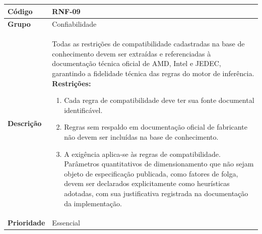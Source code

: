 \FloatBarrier
\begin{quadro}[htb]
  \caption{RNF-09 -- Restrições derivadas de documentação oficial dos fabricantes}
  \label{quad:rnf09}
  \begin{tabular}{|p{3.2cm}|p{11.8cm}|}
    \hline
    \textbf{Código}     & RNF-09                                                                                                                                                                                                                                                                                     \\ \hline
    \textbf{Grupo}      & Confiabilidade                                                                                                                                                                                                                                                                             \\ \hline
    \textbf{Descrição}  &
    Todas as restrições de compatibilidade cadastradas na base de conhecimento devem ser extraídas e referenciadas à documentação técnica oficial de AMD, Intel e JEDEC, garantindo a fidelidade técnica das regras do motor de inferência.
    \textbf{Restrições:}
    \begin{enumerate}[nosep,leftmargin=1.2em,topsep=2pt,partopsep=0pt,parsep=0pt,itemsep=1pt]
      \item Cada regra de compatibilidade deve ter sua fonte documental identificável.
      \item Regras sem respaldo em documentação oficial de fabricante não devem ser incluídas na base de conhecimento.
      \item A exigência aplica-se às regras de compatibilidade. Parâmetros quantitativos de dimensionamento que não sejam objeto de especificação publicada, como fatores de folga, devem ser declarados explicitamente como heurísticas adotadas, com sua justificativa registrada na documentação da implementação.
    \end{enumerate} \\ \hline
    \textbf{Prioridade} & Essencial                                                                                                                                                                                                                                                                                  \\ \hline

\end{tabular}
\end{quadro}
